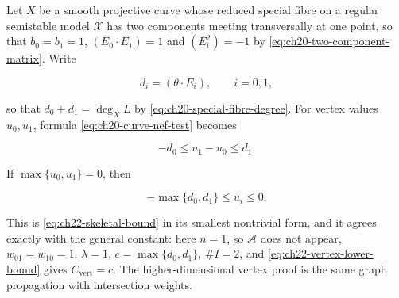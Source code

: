 \begin{example}
\label{ex:ch22-two-vertex}
Let $X$ be a smooth projective curve whose reduced special fibre on a
regular semistable model $\mathcal X$ has two components meeting
transversally at one point, so that $b_0=b_1=1$, $(E_0\cdot E_1)=1$ and
$(E_i^2)=-1$ by \eqref{eq:ch20-two-component-matrix}.  Write

\[
              d_i=(\theta\cdot E_i),\qquad i=0,1,
\]

so that $d_0+d_1=\deg_XL$ by \eqref{eq:ch20-special-fibre-degree}.  For
vertex values $u_0,u_1$, formula
\eqref{eq:ch20-curve-nef-test} becomes

\[
                   -d_0\leq u_1-u_0\leq d_1.
\tag{22.55}\label{eq:ch22-two-vertex-bound}
\]

If $\max\{u_0,u_1\}=0$, then

\[
                   -\max\{d_0,d_1\}\leq u_i\leq0.
\]

This is \eqref{eq:ch22-skeletal-bound} in its smallest nontrivial form, and
it agrees exactly with the general constant: here $n=1$, so
$\mathcal A$ does not appear, $w_{01}=w_{10}=1$, $\lambda=1$,
$c=\max\{d_0,d_1\}$, $\#I=2$, and
\eqref{eq:ch22-vertex-lower-bound} gives
$C_{\mathrm{vert}}=c$.  The higher-dimensional vertex proof is the same
graph propagation with intersection weights.
\end{example}

